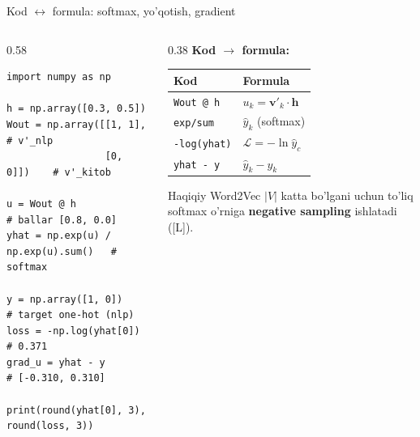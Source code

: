 \documentclass[aspectratio=169,11pt]{beamer}
\begin{document}
\begin{frame}[fragile]{Kod $\leftrightarrow$ formula: softmax, yo'qotish, gradient}
  \begin{columns}[T]
    \begin{column}{0.58\textwidth}
\begin{lstlisting}
import numpy as np

h = np.array([0.3, 0.5])
Wout = np.array([[1, 1],    # v'_nlp
                 [0, 0]])    # v'_kitob

u = Wout @ h                 # ballar [0.8, 0.0]
yhat = np.exp(u) / np.exp(u).sum()   # softmax

y = np.array([1, 0])         # target one-hot (nlp)
loss = -np.log(yhat[0])      # 0.371
grad_u = yhat - y            # [-0.310, 0.310]

print(round(yhat[0], 3), round(loss, 3))
\end{lstlisting}
    \end{column}
    \begin{column}{0.38\textwidth}
      \textbf{Kod $\to$ formula:}\\[3pt]
      \footnotesize
      \begin{tabular}{p{1.7cm}p{1.9cm}}
        \toprule
        Kod & Formula \\
        \midrule
        \texttt{Wout @ h} & $u_k=\mathbf{v}'_k\cdot\mathbf{h}$ \\
        \texttt{exp/sum} & $\hat{y}_k$ (softmax) \\
        \texttt{-log(yhat)} & $\mathcal{L}=-\ln\hat{y}_c$ \\
        \texttt{yhat - y} & $\hat{y}_k - y_k$ \\
        \bottomrule
      \end{tabular}
      \vspace{4pt}
      \begin{tcolorbox}[warnbox,top=2pt,bottom=2pt]
        \footnotesize
        Haqiqiy Word2Vec $|V|$ katta bo'lgani uchun to'liq softmax o'rniga
        \textbf{negative sampling} ishlatadi ([L]).
      \end{tcolorbox}
    \end{column}
  \end{columns}
\end{frame}
\end{document}
